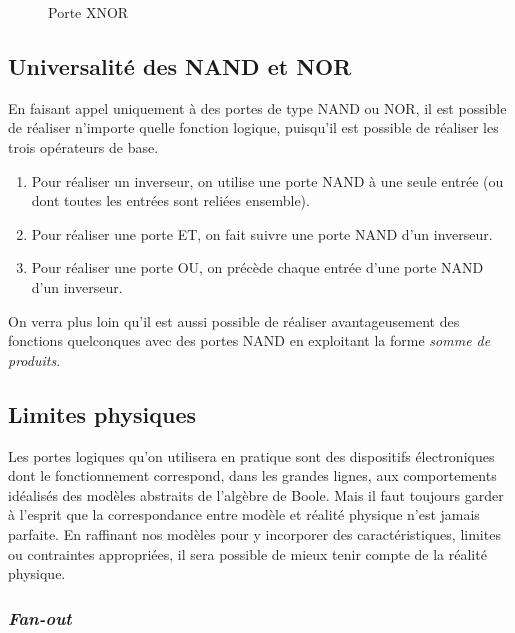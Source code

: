 \documentclass[11pt]{article}
\begin{document}
\begin{figure}[htbp]
\centering

\caption{\label{fig:org9ac9e88}Porte XNOR}
\end{figure}

\subsection{Universalité des NAND et NOR}
\label{sec:org0e20774}

En faisant appel uniquement à des portes de type NAND ou NOR, il est
possible de réaliser n'importe quelle fonction logique, puisqu'il est
possible de réaliser les trois opérateurs de base.

\begin{enumerate}
\item Pour réaliser un inverseur, on utilise une porte NAND à une seule
entrée (ou dont toutes les entrées sont reliées ensemble).
\item Pour réaliser une porte ET, on fait suivre une porte NAND d'un
inverseur.
\item Pour réaliser une porte OU, on précède chaque entrée d'une porte
NAND d'un inverseur.
\end{enumerate}

On verra plus loin qu'il est aussi possible de réaliser
avantageusement des fonctions quelconques avec des portes NAND en
exploitant la forme \emph{somme de produits}.

\subsection{Limites physiques}
\label{sec:org9add23a}

Les portes logiques qu'on utilisera en pratique sont des dispositifs
électroniques dont le fonctionnement correspond, dans les grandes
lignes, aux comportements idéalisés des modèles abstraits de l'algèbre
de Boole. Mais il faut toujours garder à l'esprit que la
correspondance entre modèle et réalité physique n'est jamais
parfaite. En raffinant nos modèles pour y incorporer des
caractéristiques, limites ou contraintes appropriées, il sera possible
de mieux tenir compte de la réalité physique.

\subsubsection{\emph{Fan-out}}
\label{sec:org689fc91}
\end{document}

